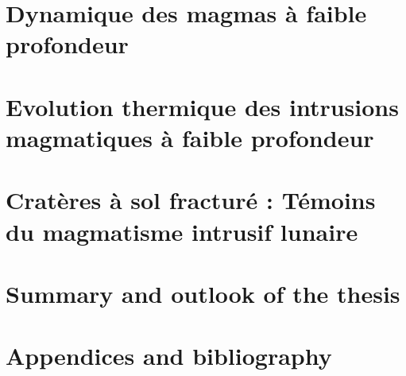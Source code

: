 \documentclass[a4paper,12pt,twoside]{ThesisStyle}
\begin{document}


\dominitoc
\setcounter{tocdepth}{2}

\cleardoublepage



\cleardoublepage





\tableofcontents

\mainmatter
\part{Dynamique des magmas à faible profondeur}

\pagestyle{fancy}




\part{Evolution   thermique  des   intrusions  magmatiques   à  faible
  profondeur}




\part{Cratères à sol fracturé : Témoins du magmatisme intrusif lunaire}


 

\part{Summary and outlook of the thesis}





\part{Appendices and bibliography}

\appendix







\printnomenclature



\end{document}
